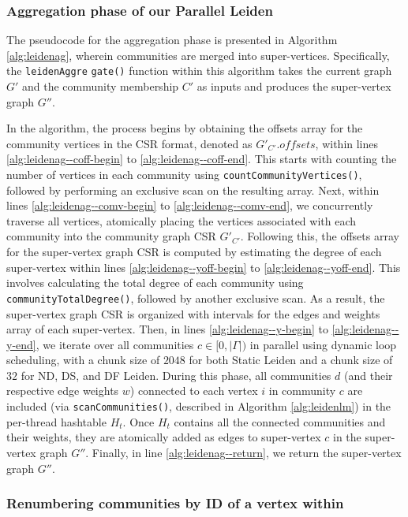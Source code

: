 \subsubsection{Aggregation phase of our Parallel Leiden}

The pseudocode for the aggregation phase is presented in Algorithm \ref{alg:leidenag}, wherein communities are merged into super-vertices. Specifically, the \texttt{leidenAggre} \texttt{gate()} function within this algorithm takes the current graph $G'$ and the community membership $C'$ as inputs and produces the super-vertex graph $G''$.



In the algorithm, the process begins by obtaining the offsets array for the community vertices in the CSR format, denoted as $G'_{C'}.offsets$, within lines \ref{alg:leidenag--coff-begin} to \ref{alg:leidenag--coff-end}. This starts with counting the number of vertices in each community using \texttt{countCommunityVertices()}, followed by performing an exclusive scan on the resulting array. Next, within lines \ref{alg:leidenag--comv-begin} to \ref{alg:leidenag--comv-end}, we concurrently traverse all vertices, atomically placing the vertices associated with each community into the community graph CSR $G'_{C'}$. Following this, the offsets array for the super-vertex graph CSR is computed by estimating the degree of each super-vertex within lines \ref{alg:leidenag--yoff-begin} to \ref{alg:leidenag--yoff-end}. This involves calculating the total degree of each community using \texttt{communityTotalDegree()}, followed by another exclusive scan. As a result, the super-vertex graph CSR is organized with intervals for the edges and weights array of each super-vertex. Then, in lines \ref{alg:leidenag--y-begin} to \ref{alg:leidenag--y-end}, we iterate over all communities $c \in [0, |\Gamma|)$ in parallel using dynamic loop scheduling, with a chunk size of $2048$ for both Static Leiden and a chunk size of $32$ for ND, DS, and DF Leiden. During this phase, all communities $d$ (and their respective edge weights $w$) connected to each vertex $i$ in community $c$ are included (via \texttt{scanCommunities()}, described in Algorithm \ref{alg:leidenlm}) in the per-thread hashtable $H_t$. Once $H_t$ contains all the connected communities and their weights, they are atomically added as edges to super-vertex $c$ in the super-vertex graph $G''$. Finally, in line \ref{alg:leidenag--return}, we return the super-vertex graph $G''$.


\subsubsection{Renumbering communities by ID of a vertex within}


